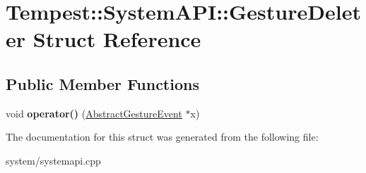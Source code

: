 \hypertarget{struct_system_a_p_i_1_1_gesture_deleter}{\section{Tempest\+:\+:System\+A\+P\+I\+:\+:Gesture\+Deleter Struct Reference}
\label{struct_system_a_p_i_1_1_gesture_deleter}
}
\subsection*{Public Member Functions}
\begin{DoxyCompactItemize}
\item 
\hypertarget{struct_system_a_p_i_1_1_gesture_deleter_a05d5a5c518cbe2186ab746935e995261}{void {\bfseries operator()} (\hyperlink{class_tempest_1_1_abstract_gesture_event}{Abstract\+Gesture\+Event} $\ast$x)}\label{struct_system_a_p_i_1_1_gesture_deleter_a05d5a5c518cbe2186ab746935e995261}

\end{DoxyCompactItemize}


The documentation for this struct was generated from the following file\+:\begin{DoxyCompactItemize}
\item 
system/systemapi.\+cpp\end{DoxyCompactItemize}
